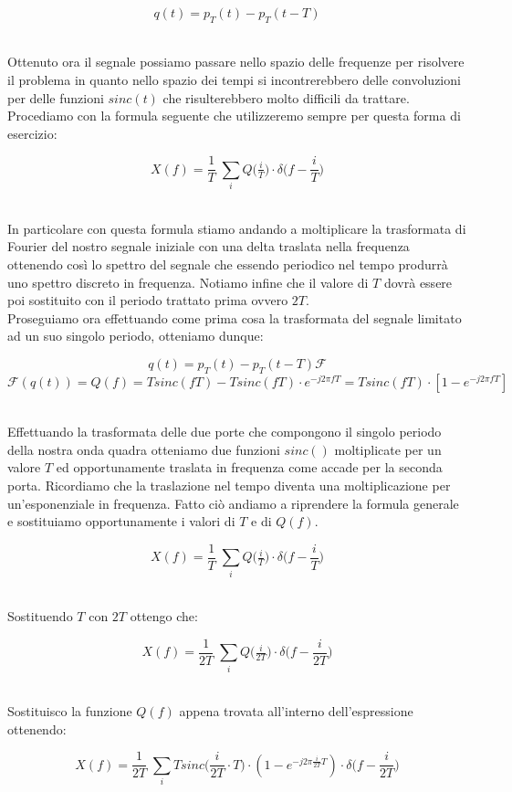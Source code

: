 \documentclass[../main.tex]{subfiles}
\begin{document}
\[q(t) = p_T(t) - p_T(t - T) \]\

Ottenuto ora il segnale possiamo passare nello spazio delle frequenze per risolvere il problema in quanto nello spazio dei tempi si incontrerebbero delle convoluzioni per delle funzioni $sinc(t)$ che risulterebbero molto difficili da trattare.
Procediamo con la formula seguente che utilizzeremo sempre per questa forma di esercizio:

\[X(f) = \frac{1}{T} \; \sum_i Q \big(\tfrac{i}{T}\big) \cdot \delta\bigg(f - \frac{i}{T}\bigg)    \]\

In particolare con questa formula stiamo andando a moltiplicare la trasformata di Fourier del nostro segnale iniziale con una delta traslata nella frequenza ottenendo così lo spettro del segnale che essendo periodico nel tempo produrrà uno spettro discreto in frequenza.
Notiamo infine che il valore di $T$ dovrà essere poi sostituito con il periodo trattato prima ovvero $2T$.\\

Proseguiamo ora effettuando come prima cosa la trasformata del segnale limitato ad un suo singolo periodo, otteniamo dunque:

\[ q(t) = p_T(t) - p_T(t - T)  \mathcal{F}\]
\[ \mathcal{F}(q(t)) = Q(f) = T\unit{sinc}(fT) - T\unit{sinc}(fT) \cdot e^{-j2\pi fT} = T\unit{sinc}(fT) \cdot [1 - e^{-j2\pi fT}] \]\

Effettuando la trasformata delle due porte che compongono il singolo periodo della nostra onda quadra otteniamo due funzioni $sinc()$ moltiplicate per un valore $T$ ed opportunamente traslata in frequenza come accade per la seconda porta. Ricordiamo che la traslazione nel tempo diventa una moltiplicazione per un'esponenziale in frequenza.
Fatto ciò andiamo a riprendere la formula generale e sostituiamo opportunamente i valori di $T$ e di $Q(f)$.

\[X(f) = \frac{1}{T} \; \sum_i Q \big(\tfrac{i}{T}\big) \cdot \delta\bigg(f - \frac{i}{T}\bigg)\]\

Sostituendo $T$ con $2T$ ottengo che:

\[X(f) = \frac{1}{2T} \; \sum_i Q \big(\tfrac{i}{2T}\big) \cdot \delta\bigg(f - \frac{i}{2T}\bigg)    \]\

Sostituisco la funzione $Q(f)$ appena trovata all'interno dell'espressione ottenendo:

\[ X(f) = \frac{1}{2T} \; \sum_i T\unit{sinc}\bigg(\frac{i}{2T} \cdot T \bigg) \cdot (1 - e^{-j2\pi \frac{i}{2T} T}) \cdot \delta\bigg(f - \frac{i}{2T}\bigg)  \]\
\end{document}
